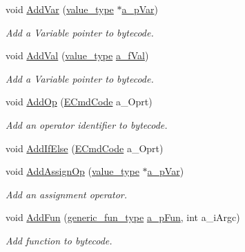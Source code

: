 \begin{DoxyCompactItemize}
void \hyperlink{classmu_1_1_parser_byte_code_aca82e62831e3f62b1b0086b64622938b}{Add\+Var} (\hyperlink{namespacemu_a17d4f113a4b88b8d971cca8ddbbe8a47}{value\+\_\+type} $\ast$\hyperlink{mu_parser_d_l_l_8h_a3712e893ac2c28322464f6eebc1a0862}{a\+\_\+p\+Var})
\begin{DoxyCompactList}\small\item\em Add a Variable pointer to bytecode. \end{DoxyCompactList}\item 
void \hyperlink{classmu_1_1_parser_byte_code_a8d24daef40331ddb1b69d3fe631181b0}{Add\+Val} (\hyperlink{namespacemu_a17d4f113a4b88b8d971cca8ddbbe8a47}{value\+\_\+type} \hyperlink{mu_parser_d_l_l_8h_a8ed6c2f8e84831a06620ad0546609ae6}{a\+\_\+f\+Val})
\begin{DoxyCompactList}\small\item\em Add a Variable pointer to bytecode. \end{DoxyCompactList}\item 
void \hyperlink{classmu_1_1_parser_byte_code_a28c5a8c3be833f6fbb5e8036b1504ad6}{Add\+Op} (\hyperlink{namespacemu_ab77181e591bebd278bf9c7a2e30ad40e}{E\+Cmd\+Code} a\+\_\+\+Oprt)
\begin{DoxyCompactList}\small\item\em Add an operator identifier to bytecode. \end{DoxyCompactList}\item 
void \hyperlink{classmu_1_1_parser_byte_code_afb9d010d603e0300737a50e1148049d8}{Add\+If\+Else} (\hyperlink{namespacemu_ab77181e591bebd278bf9c7a2e30ad40e}{E\+Cmd\+Code} a\+\_\+\+Oprt)
\item 
void \hyperlink{classmu_1_1_parser_byte_code_af9e447fca3942ee5b145415dae78a821}{Add\+Assign\+Op} (\hyperlink{namespacemu_a17d4f113a4b88b8d971cca8ddbbe8a47}{value\+\_\+type} $\ast$\hyperlink{mu_parser_d_l_l_8h_a3712e893ac2c28322464f6eebc1a0862}{a\+\_\+p\+Var})
\begin{DoxyCompactList}\small\item\em Add an assignment operator. \end{DoxyCompactList}\item 
void \hyperlink{classmu_1_1_parser_byte_code_a57c6b293b779228f389dcedeff6262f6}{Add\+Fun} (\hyperlink{namespacemu_ae289766395042975b51dda382cccc907}{generic\+\_\+fun\+\_\+type} \hyperlink{mu_parser_d_l_l_8h_ab3a3ed85edf393f2b8ad69081fe538e8}{a\+\_\+p\+Fun}, int a\+\_\+i\+Argc)
\begin{DoxyCompactList}\small\item\em Add function to bytecode. \end{DoxyCompactList}\item 

\end{DoxyCompactItemize}
